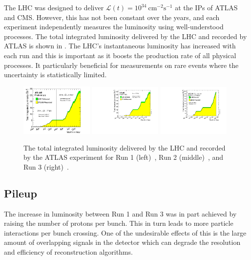 The LHC was designed to deliver $\mathcal{L}(t) = 10^{34}~\unit{\centi\meter^{-2}\second^{-1}}$ at the IPs of ATLAS and CMS.
However, this has not been constant over the years, and each experiment independently measures the luminosity using well-understood processes.
The total integrated luminosity delivered by the LHC and recorded by ATLAS is shown in .
The LHC's instantaneous luminosity has increased with each run and this is important as it boosts the production rate of all physical processes.
It particularly beneficial for measurements on rare events where the uncertainty is statistically limited.

\begin{figure}
    \centering
    \includegraphics[width=0.32\textwidth]{Figures/cern_atlas/lumi1.pdf}
    \includegraphics[width=0.32\textwidth]{Figures/cern_atlas/lumi2.pdf}
    \includegraphics[width=0.32\textwidth]{Figures/cern_atlas/lumi3.pdf}
    \caption{The total integrated luminosity delivered by the LHC and recorded by the ATLAS experiment for Run 1 (left)~\cite{run1data}, Run 2 (middle)~\cite{run2data}, and Run 3 (right)~\cite{run3data}.}
    \label{fig:luminosity}
\end{figure}

\subsection{Pileup}

The increase in luminosity between Run 1 and Run 3 was in part achieved by raising the number of protons per bunch.
This in turn leads to more particle interactions per bunch crossing.
One of the undesirable effects of this is the large amount of overlapping signals in the detector which can degrade the resolution and efficiency of reconstruction algorithms.

